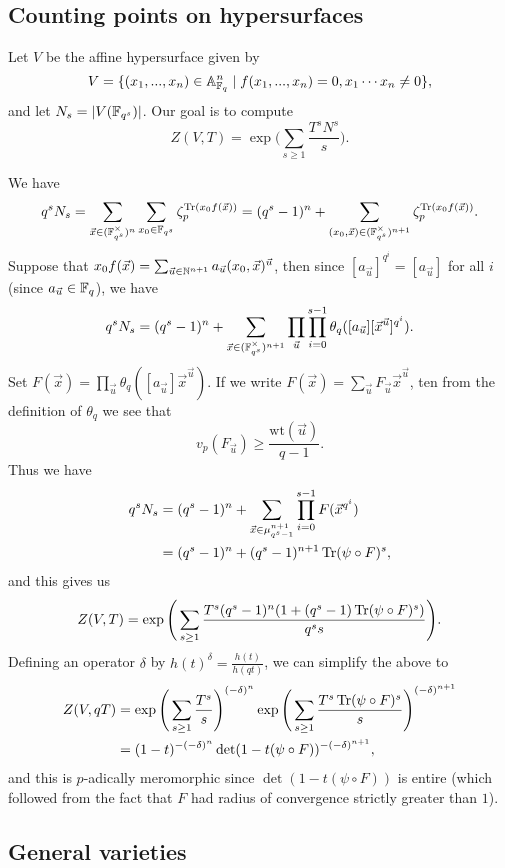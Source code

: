 \subsection{Counting points on hypersurfaces}

Let $V$ be the affine hypersurface given by
\[
V = \{(x_1, ..., x_n) \in \mathbb{A}^n_{\mathbb{F}_q} \mid f(x_1, ..., x_n) = 0, x_1\cdots x_n \ne 0\},
\]
and let $N_s = |V(\mathbb{F}_{q^s})|$. Our goal is to compute
\[
Z(V,T) = \exp\Big(\sum_{s \ge 1} \frac{T^sN^s}{s}\Big).
\]

We have
\[
q^sN_s = \sum_{\vec{x}\in (\mathbb{F}_{q^s}^{\times})^n} \sum_{x_0 \in \mathbb{F}_{q^s}} \zeta_p^{\operatorname{Tr}(x_0f(\vec{x}))} = (q^s-1)^n + \sum_{(x_0,\vec{x})\in (\mathbb{F}_{q^s}^{\times})^{n+1}} \zeta_p^{\operatorname{Tr}(x_0f(\vec{x}))}.
\]
Suppose that $x_0f(\vec{x}) = \sum_{\vec{u} \in \mathbb{N}^{n+1}} a_{\vec{u}} (x_0,\vec{x})^{\vec{u}}$, then since $[a_{\vec{u}}]^{q^i} = [a_{\vec{u}}]$ for all $i$ (since $a_{\vec{u}} \in \mathbb{F}_q$), we have
\[
q^sN_s = (q^s-1)^n + \sum_{\vec{x}\in (\mathbb{F}_{q^s}^{\times})^{n+1}} \prod_{\vec{u}} \prod_{i=0}^{s-1} \theta_q([a_{\vec{u}}][\vec{x}^{\vec{u}}]^{q^i}).
\]
Set $F(\vec{x}) = \prod_{\vec{u}}\theta_q([a_{\vec{u}}]\vec{x}^{\vec{u}})$. If we write $F(\vec{x}) = \sum_{\vec{u}} F_{\vec{u}}\vec{x}^{\vec{u}}$, ten from the definition of $\theta_q$ we see that
\[
v_p(F_{\vec{u}}) \ge \frac{\mbox{wt}(\vec{u})}{q-1}.
\]
Thus we have
\begin{align*}
q^sN_s &= (q^s-1)^n + \sum_{\vec{x}\in \mu_{q^s-1}^{n+1}} \prod_{i=0}^{s-1} F(\vec{x}^{q^i})\\
&= (q^s-1)^n + (q^s-1)^{n+1}\operatorname{Tr}(\psi \circ F)^s,
\end{align*}
and this gives us
\[
Z(V,T) = \exp\Bigg(\sum_{s \ge 1} \frac{T^s(q^s-1)^n(1+(q^s-1)\operatorname{Tr}(\psi\circ F)^s)}{q^ss}\Bigg).
\]
Defining an operator $\delta$ by $h(t)^{\delta} = \frac{h(t)}{h(qt)}$, we can simplify the above to
\begin{align*}
Z(V,qT) &= \exp\Bigg(\sum_{s \ge 1} \frac{T^s}{s}\Bigg)^{(-\delta)^n}\exp\Bigg(\sum_{s \ge 1} \frac{T^s\operatorname{Tr} (\psi\circ F)^s}{s}\Bigg)^{(-\delta)^{n+1}}\\
&= (1-t)^{-(-\delta)^n}\det(1-t(\psi\circ F))^{-(-\delta)^{n+1}},
\end{align*}
and this is $p$-adically meromorphic since $\det(1-t(\psi\circ F))$ is entire (which followed from the fact that $F$ had radius of convergence strictly greater than $1$).

\subsection{General varieties}


